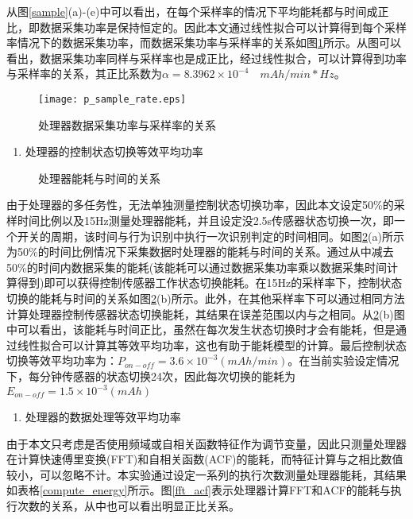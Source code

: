 \par 从图\ref{sample}(a)-(e)中可以看出，在每个采样率的情况下平均能耗都与时间成正比，即数据采集功率是保持恒定的。因此本文通过线性拟合可以计算得到每个采样率情况下的数据采集功率，而数据采集功率与采样率的关系如图\ref{p_sample_rate}所示。从图可以看出，数据采集功率同样与采样率也是成正比，经过线性拟合，可以计算得到功率与采样率的关系，其正比系数为$\alpha = 8.3962 \times 10^{-4} \quad mAh/min*Hz$。

\begin{figure}[!htb]
\centering
\texttt{[image: p\_sample\_rate.eps]}
\caption{处理器数据采集功率与采样率的关系}\label{p_sample_rate}
\end{figure}


\begin{enumerate}[(3)]
	\item 处理器的控制状态切换等效平均功率
\end{enumerate}

\begin{figure}[!htb]
    \centering
    \caption{处理器能耗与时间的关系}\label{on-off}
\end{figure}

\par 由于处理器的多任务性，无法单独测量控制状态切换功率，因此本文设定50\%的采样时间比例以及15Hz测量处理器能耗，并且设定没2.5s传感器状态切换一次，即一个开关的周期，该时间与行为识别中执行一次识别判定的时间相同。如图\ref{on-off}(a)所示为50\%的时间比例情况下采集数据时处理器的能耗与时间的关系。通过从中减去50\%的时间内数据采集的能耗(该能耗可以通过数据采集功率乘以数据采集时间计算得到)即可以获得控制传感器工作状态切换能耗。在15Hz的采样率下，控制状态切换的能耗与时间的关系如图\ref{on-off}(b)所示。此外，在其他采样率下可以通过相同方法计算处理器控制传感器状态切换能耗，其结果在误差范围以内与之相同。从\ref{on-off}(b)图中可以看出，该能耗与时间正比，虽然在每次发生状态切换时才会有能耗，但是通过线性拟合可以计算其等效平均功率，这也有助于能耗模型的计算。最后控制状态切换等效平均功率为：$P_{on-off} = 3.6 \times 10^{-3} (mAh/min)$。在当前实验设定情况下，每分钟传感器的状态切换24次，因此每次切换的能耗为$E_{on-off} = 1.5 \times 10^{-3}(mAh)$

\begin{enumerate}[(4)]
	\item 处理器的数据处理等效平均功率
\end{enumerate}
\par 由于本文只考虑是否使用频域或自相关函数特征作为调节变量，因此只测量处理器在计算快速傅里变换(FFT)和自相关函数(ACF)的能耗，而特征计算与之相比数值较小，可以忽略不计。本实验通过设定一系列的执行次数测量处理器能耗，其结果如表格\ref{compute_energy}所示。图\ref{fft_acf}表示处理器计算FFT和ACF的能耗与执行次数的关系，从中也可以看出明显正比关系。


